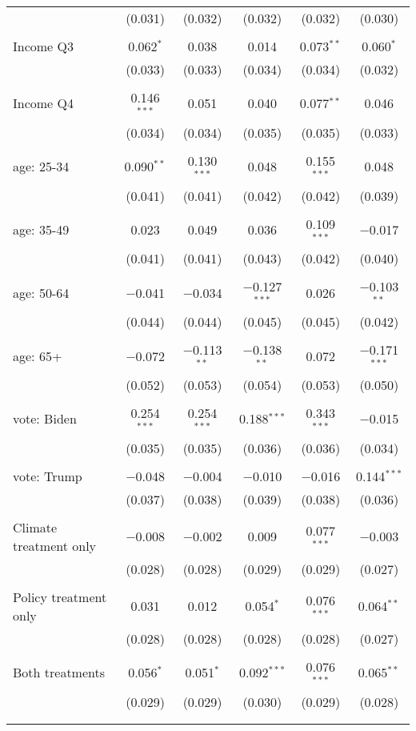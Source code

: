 \begin{tabular}{@{\extracolsep{5pt}}lccccc}
  & (0.031) & (0.032) & (0.032) & (0.032) & (0.030) \\ 
  & & & & & \\ 
 Income Q3 & 0.062$^{*}$ & 0.038 & 0.014 & 0.073$^{**}$ & 0.060$^{*}$ \\ 
  & (0.033) & (0.033) & (0.034) & (0.034) & (0.032) \\ 
  & & & & & \\ 
 Income Q4 & 0.146$^{***}$ & 0.051 & 0.040 & 0.077$^{**}$ & 0.046 \\ 
  & (0.034) & (0.034) & (0.035) & (0.035) & (0.033) \\ 
  & & & & & \\ 
 age: 25-34 & 0.090$^{**}$ & 0.130$^{***}$ & 0.048 & 0.155$^{***}$ & 0.048 \\ 
  & (0.041) & (0.041) & (0.042) & (0.042) & (0.039) \\ 
  & & & & & \\ 
 age: 35-49 & 0.023 & 0.049 & 0.036 & 0.109$^{***}$ & $-$0.017 \\ 
  & (0.041) & (0.041) & (0.043) & (0.042) & (0.040) \\ 
  & & & & & \\ 
 age: 50-64 & $-$0.041 & $-$0.034 & $-$0.127$^{***}$ & 0.026 & $-$0.103$^{**}$ \\ 
  & (0.044) & (0.044) & (0.045) & (0.045) & (0.042) \\ 
  & & & & & \\ 
 age: 65+ & $-$0.072 & $-$0.113$^{**}$ & $-$0.138$^{**}$ & 0.072 & $-$0.171$^{***}$ \\ 
  & (0.052) & (0.053) & (0.054) & (0.053) & (0.050) \\ 
  & & & & & \\ 
 vote: Biden & 0.254$^{***}$ & 0.254$^{***}$ & 0.188$^{***}$ & 0.343$^{***}$ & $-$0.015 \\ 
  & (0.035) & (0.035) & (0.036) & (0.036) & (0.034) \\ 
  & & & & & \\ 
 vote: Trump & $-$0.048 & $-$0.004 & $-$0.010 & $-$0.016 & 0.144$^{***}$ \\ 
  & (0.037) & (0.038) & (0.039) & (0.038) & (0.036) \\ 
  & & & & & \\ 
 Climate treatment only & $-$0.008 & $-$0.002 & 0.009 & 0.077$^{***}$ & $-$0.003 \\ 
  & (0.028) & (0.028) & (0.029) & (0.029) & (0.027) \\ 
  & & & & & \\ 
 Policy treatment only & 0.031 & 0.012 & 0.054$^{*}$ & 0.076$^{***}$ & 0.064$^{**}$ \\ 
  & (0.028) & (0.028) & (0.028) & (0.028) & (0.027) \\ 
  & & & & & \\ 
 Both treatments & 0.056$^{*}$ & 0.051$^{*}$ & 0.092$^{***}$ & 0.076$^{***}$ & 0.065$^{**}$ \\ 
  & (0.029) & (0.029) & (0.030) & (0.029) & (0.028) \\ 
  & & & & & \\ 
\hline \\[-1.8ex] 


\end{tabular}
